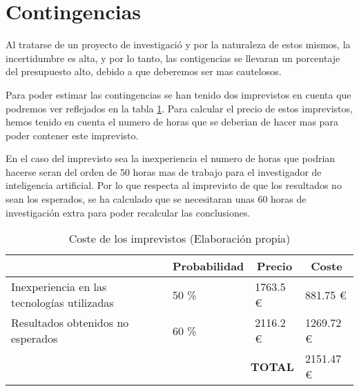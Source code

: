 \section{Contingencias}
\label{sec:contingencias}

Al tratarse de un proyecto de investigació y por la naturaleza de estos mismos, la incertidumbre es alta, y por lo tanto, las contigencias se llevaran un 
porcentaje del presupuesto alto, debido a que deberemos ser mas cautelosos.

Para poder estimar las contingencias se han tenido dos imprevistos en cuenta que podremos ver reflejados en la tabla \ref{tab:contingencias}. Para calcular el
precio de estos imprevistos, hemos tenido en cuenta el numero de horas que se deberian de hacer mas para poder contener este imprevisto.

En el caso del imprevisto sea la inexperiencia el numero de horas que podrian hacerse seran del orden de 50 horas mas de trabajo para el investigador de inteligencia artificial.
Por lo que respecta al imprevisto de que los resultados no sean los esperados, se ha calculado que se necesitaran unas 60 horas de investigación extra para poder
recalcular las conclusiones.

\begin{table}[H]
    \centering
    \begin{tabular}{|lll|l|}
    \hline
    \rowcolor[HTML]{8EA9D8} 
    \multicolumn{1}{|c|}{\cellcolor[HTML]{8EA9D8}\textbf{Imprevisto}} & \multicolumn{1}{c|}{\cellcolor[HTML]{8EA9D8}\textbf{Probabilidad}} & \multicolumn{1}{c|}{\cellcolor[HTML]{8EA9D8}\textbf{Precio}} & \multicolumn{1}{c|}{\cellcolor[HTML]{8EA9D8}\textbf{Coste}} \\ \hline
    \multicolumn{1}{|l|}{Inexperiencia en las tecnologías utilizadas} & \multicolumn{1}{l|}{50 \%}                                          & 1763.5 €                                                     & 881.75 €                                                    \\ \hline
    \multicolumn{1}{|l|}{Resultados obtenidos no esperados}           & \multicolumn{1}{l|}{60 \%}                                          & 2116.2 €                                                     & 1269.72 €                                                   \\ \hline
    \multicolumn{3}{|r|}{\textbf{TOTAL}}                                                                                                                                                                  & 2151.47 €                                                   \\ \hline
    \end{tabular}
    \caption{Coste de los imprevistos (Elaboración propia)}
    \label{tab:contingencias}
\end{table}

